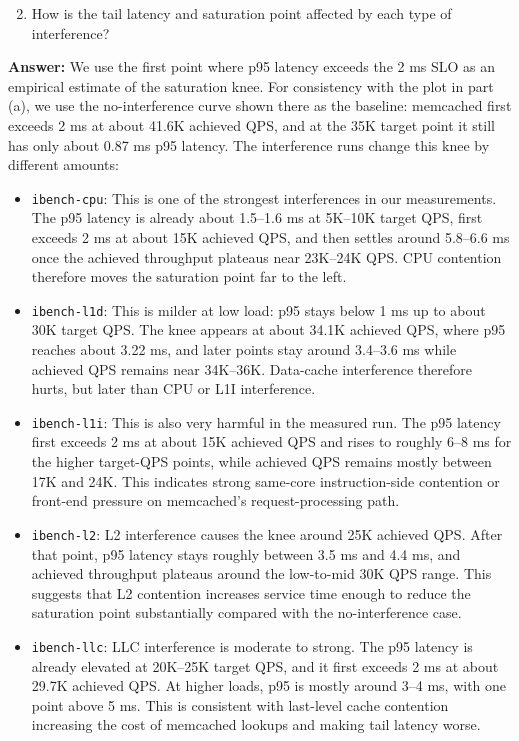 \begin{enumerate}[label=(\alph*)]
    \setcounter{enumi}{1}
    \item How is the tail latency and saturation point affected by each type of interference?
\end{enumerate}

\textbf{Answer:}
We use the first point where p95 latency exceeds the 2 ms SLO as an empirical estimate of the saturation knee. For consistency with the plot in part (a), we use the no-interference curve shown there as the baseline: memcached first exceeds 2 ms at about 41.6K achieved QPS, and at the 35K target point it still has only about 0.87 ms p95 latency. The interference runs change this knee by different amounts:
\begin{itemize}
    \item \texttt{ibench-cpu}: This is one of the strongest interferences in our measurements. The p95 latency is already about 1.5--1.6 ms at 5K--10K target QPS, first exceeds 2 ms at about 15K achieved QPS, and then settles around 5.8--6.6 ms once the achieved throughput plateaus near 23K--24K QPS. CPU contention therefore moves the saturation point far to the left.
    \item \texttt{ibench-l1d}: This is milder at low load: p95 stays below 1 ms up to about 30K target QPS. The knee appears at about 34.1K achieved QPS, where p95 reaches about 3.22 ms, and later points stay around 3.4--3.6 ms while achieved QPS remains near 34K--36K. Data-cache interference therefore hurts, but later than CPU or L1I interference.
    \item \texttt{ibench-l1i}: This is also very harmful in the measured run. The p95 latency first exceeds 2 ms at about 15K achieved QPS and rises to roughly 6--8 ms for the higher target-QPS points, while achieved QPS remains mostly between 17K and 24K. This indicates strong same-core instruction-side contention or front-end pressure on memcached's request-processing path.
    \item \texttt{ibench-l2}: L2 interference causes the knee around 25K achieved QPS. After that point, p95 latency stays roughly between 3.5 ms and 4.4 ms, and achieved throughput plateaus around the low-to-mid 30K QPS range. This suggests that L2 contention increases service time enough to reduce the saturation point substantially compared with the no-interference case.
    \item \texttt{ibench-llc}: LLC interference is moderate to strong. The p95 latency is already elevated at 20K--25K target QPS, and it first exceeds 2 ms at about 29.7K achieved QPS. At higher loads, p95 is mostly around 3--4 ms, with one point above 5 ms. This is consistent with last-level cache contention increasing the cost of memcached lookups and making tail latency worse.

\end{itemize}
